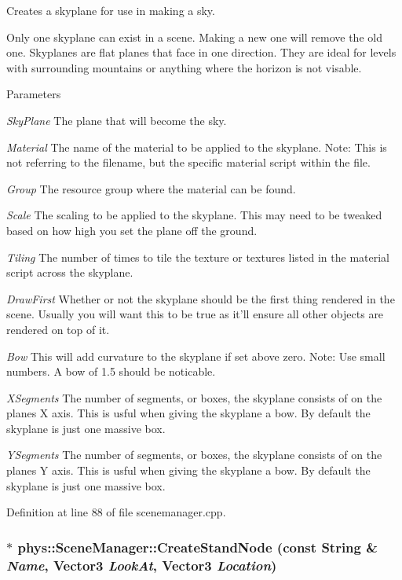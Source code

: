 Creates a skyplane for use in making a sky. 

Only one skyplane can exist in a scene. Making a new one will remove the old one. Skyplanes are flat planes that face in one direction. They are ideal for levels with surrounding mountains or anything where the horizon is not visable. 
\begin{DoxyParams}{Parameters}
\item[{\em SkyPlane}]The plane that will become the sky. \item[{\em Material}]The name of the material to be applied to the skyplane. Note: This is not referring to the filename, but the specific material script within the file. \item[{\em Group}]The resource group where the material can be found. \item[{\em Scale}]The scaling to be applied to the skyplane. This may need to be tweaked based on how high you set the plane off the ground. \item[{\em Tiling}]The number of times to tile the texture or textures listed in the material script across the skyplane. \item[{\em DrawFirst}]Whether or not the skyplane should be the first thing rendered in the scene. Usually you will want this to be true as it'll ensure all other objects are rendered on top of it. \item[{\em Bow}]This will add curvature to the skyplane if set above zero. Note: Use small numbers. A bow of 1.5 should be noticable. \item[{\em XSegments}]The number of segments, or boxes, the skyplane consists of on the planes X axis. This is usful when giving the skyplane a bow. By default the skyplane is just one massive box. \item[{\em YSegments}]The number of segments, or boxes, the skyplane consists of on the planes Y axis. This is usful when giving the skyplane a bow. By default the skyplane is just one massive box. \end{DoxyParams}


Definition at line 88 of file scenemanager.cpp.

\hypertarget{classphys_1_1SceneManager_a07f3ee064d412908e14a3fe577d6ac80}{
\subsubsection[{CreateStandNode}]{ $\ast$ phys::SceneManager::CreateStandNode (const {\bf String} \& {\em Name}, \/  {\bf Vector3} {\em LookAt}, \/  {\bf Vector3} {\em Location})}}
\label{dd/da8/classphys_1_1SceneManager_a07f3ee064d412908e14a3fe577d6ac80}


